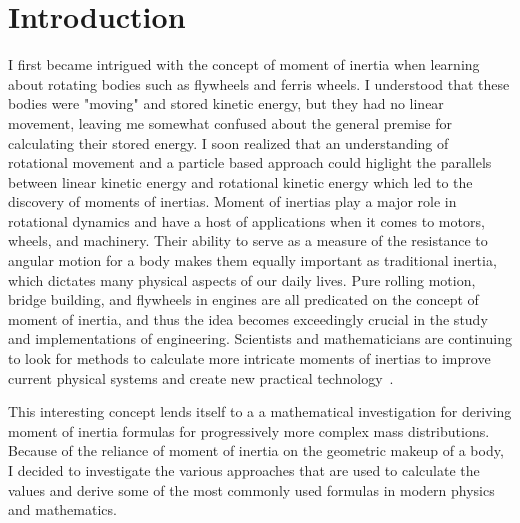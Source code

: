 \section{Introduction}
\label{sec:introduction}
I first became intrigued with the concept of moment of inertia when learning about rotating bodies such as flywheels and ferris wheels. I understood that these bodies were "moving" and stored kinetic energy, but they had no linear movement, leaving me somewhat confused about the general premise for calculating their stored energy. I soon realized that an understanding of rotational movement and a particle based approach could higlight the parallels between linear kinetic energy and rotational kinetic energy which led to the discovery of moments of inertias. Moment of inertias play a major role in rotational dynamics and have a host of applications when it comes to motors, wheels, and machinery.  Their ability to serve as a measure of the resistance to angular motion for a body makes them equally important as traditional inertia, which dictates many physical aspects of our daily lives. Pure rolling motion, bridge building, and flywheels in engines are all predicated on the concept of moment of inertia, and thus the idea becomes exceedingly crucial in the study and implementations of engineering. Scientists and mathematicians are continuing to look for methods to calculate more intricate moments of inertias to improve current physical systems and create new practical technology~\parencite{Young_Freedman_Young_2020}.


This interesting concept lends itself to a a mathematical investigation for deriving moment of inertia formulas for progressively more complex mass distributions. Because of the reliance of moment of inertia on the geometric makeup of a body, I decided to investigate the various approaches that are used to calculate the values and derive some of the most commonly used formulas in modern physics and mathematics.